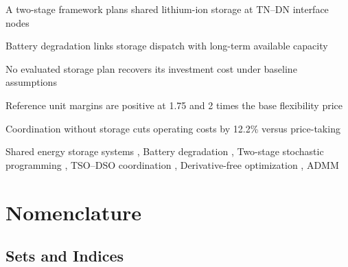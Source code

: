 \documentclass[preprint,12pt]{elsarticle}
\begin{document}
\begin{frontmatter}
\begin{highlights}
    \item A two-stage framework plans shared lithium-ion storage at TN--DN interface nodes
    \item Battery degradation links storage dispatch with long-term available capacity
    \item No evaluated storage plan recovers its investment cost under baseline assumptions
    \item Reference unit margins are positive at 1.75 and 2 times the base flexibility price
    \item Coordination without storage cuts operating costs by 12.2\% versus price-taking
\end{highlights}


\begin{keyword}
    Shared energy storage systems \sep
    Battery degradation \sep
    Two-stage stochastic programming \sep
    TSO--DSO coordination \sep
    Derivative-free optimization \sep
    ADMM
\end{keyword}


\end{frontmatter}



\section*{Nomenclature}

\subsection*{Sets and Indices}
\end{document}
